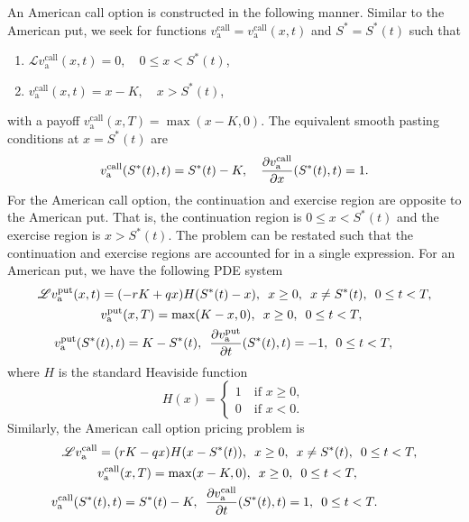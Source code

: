 	An American call option is constructed in the following manner. Similar to the American put, we seek for functions $v_\text{a}^{\text{call}} = v_\text{a}^{\text{call}}(x,t)$ and $S^* = S^*(t)$ such that
	\begin{enumerate}
			\item $\mathscr{L}v_\text{a}^{\text{call}}(x,t) = 0, \quad 0 \leq x < S^*(t)$,
			\item $v_\text{a}^{\text{call}}(x,t) = x - K, \quad x > S^*(t)$,
	\end{enumerate}
	with a payoff $v_\text{a}^{\text{call}}(x,T) = \max(x-K,0)$. The equivalent smooth pasting conditions at $x = S^*(t)$ are
		\begin{equation*}
			v_\text{a}^{\text{call}}(S^*(t),t) = S^*(t) - K, \quad \frac{\partial v_\text{a}^{\text{call}}}{\partial x}(S^*(t),t) = 1.
		\end{equation*}
	For the American call option, the continuation and exercise region are opposite to the American put. That is, the continuation region is $0 \leq x < S^*(t)$ and the exercise region is $x > S^*(t)$. The problem can be restated such that the continuation and exercise regions are accounted for in a single expression. For an American put, we have the following PDE system
    \begin{align}
            \label{eqn:amerput}
            \mathscr{L}v_\text{a}^{\text{put}}(x,t) &= (-rK + qx)H(S^*(t)-x), \enskip x \geq 0, \enskip x \neq S^*(t), \enskip 0 \leq t < T,\\
            \label{eqn:amerputTerminal}
            &v_\text{a}^{\text{put}}(x,T) = \max(K-x,0), \enskip x \geq 0, \enskip 0 \leq t < T,\\
            \label{eqn:amerputpasting}
           v_\text{a}^{\text{put}}(S^*( & t),t) = K - S^*(t), \enskip \frac{\partial v_\text{a}^{\text{put}}}{\partial t}(S^*(t),t) = -1, \enskip 0 \leq t < T,
    \end{align}
    where $H$ is the standard Heaviside function
      \begin{equation}
      		\label{eqn:heaviside}
          H(x) =
          \begin{cases}
            1 \quad \text{if } x \geq 0, \\
            0 \quad \text{if } x < 0.
        \end{cases}
      \end{equation}
Similarly, the American call option pricing problem is
	 \begin{align}
            \label{eqn:amercall}
            \mathscr{L}v_\text{a}^{\text{call}}&= (rK - qx)H(x-S^*(t)), \enskip x \geq 0, \enskip x \neq S^*(t), \enskip 0 \leq t < T,\\
            \label{eqn:amercallTerminal}
            &v_\text{a}^{\text{call}}(x,T) = \max(x-K,0), \enskip x \geq 0, \enskip 0 \leq t < T,\\
            \label{eqn:amercallpasting}
           v_\text{a}^{\text{call}}(S^*( & t),t) = S^*(t) - K, \enskip \frac{\partial v_\text{a}^{\text{call}}}{\partial t}(S^*(t),t) = 1, \enskip 0 \leq t < T.
    \end{align}
